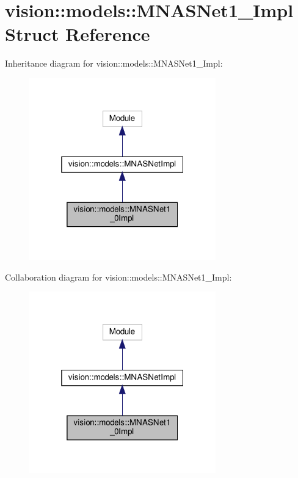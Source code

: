 \hypertarget{structvision_1_1models_1_1MNASNet1__0Impl}{}\section{vision\+:\+:models\+:\+:M\+N\+A\+S\+Net1\+\_\+Impl Struct Reference}
\label{structvision_1_1models_1_1MNASNet1__0Impl}


Inheritance diagram for vision\+:\+:models\+:\+:M\+N\+A\+S\+Net1\+\_\+Impl\+:
\nopagebreak
\begin{figure}[H]
\begin{center}
\leavevmode
\includegraphics[width=229pt]{structvision_1_1models_1_1MNASNet1__0Impl__inherit__graph}
\end{center}
\end{figure}


Collaboration diagram for vision\+:\+:models\+:\+:M\+N\+A\+S\+Net1\+\_\+Impl\+:
\nopagebreak
\begin{figure}[H]
\begin{center}
\leavevmode
\includegraphics[width=229pt]{structvision_1_1models_1_1MNASNet1__0Impl__coll__graph}
\end{center}
\end{figure}

